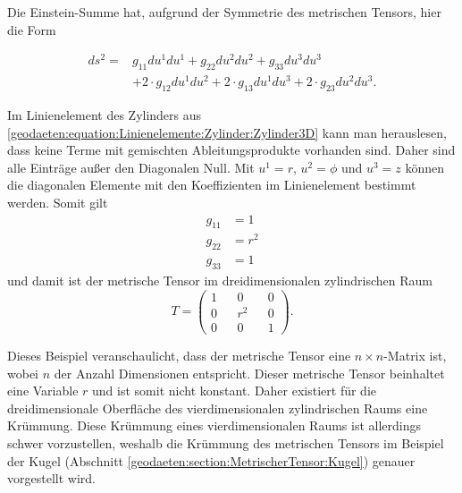 Die Einstein-Summe hat, aufgrund der Symmetrie des metrischen Tensors, hier die Form

\begin{equation}
	\begin{aligned}
	ds^2 = &g_{11}  du^1  du^1 + g_{22}  du^2  du^2 + g_{33}  du^3  du^3 \nonumber \\
	&+ 2 \cdot g_{12}  du^1  du^2 + 2 \cdot g_{13}  du^1  du^3 + 2 \cdot g_{23}  du^2  du^3 .
	\end{aligned} 
	\label{geodaeten:equation:MetrischerTensor:Kartesisch:EinsteinSumme3D}
\end{equation}

Im Linienelement des Zylinders aus \eqref{geodaeten:equation:Linienelemente:Zylinder:Zylinder3D} kann man herauslesen, dass keine Terme mit gemischten Ableitungsprodukte vorhanden sind.
Daher sind alle Einträge außer den Diagonalen Null.
Mit $u^1 = r$, $u^2 = \phi$ und $u^3 = z$  können die diagonalen Elemente mit den Koeffizienten im Linienelement bestimmt werden. 
Somit gilt
\begin{equation}
	\begin{aligned}
		g_{11}  &= 1  \\
		g_{22}  &= r^2 \\
		g_{33}  &= 1  
	\end{aligned}
\end{equation}
und damit ist der metrische Tensor im dreidimensionalen zylindrischen Raum
\begin{equation}
	T = \begin{pmatrix} 1 && 0 && 0 \\ 0 && r^2 && 0 \\ 0 && 0 && 1 \end{pmatrix} .
\end{equation}

Dieses Beispiel veranschaulicht, dass der metrische Tensor eine $n \times n$-Matrix ist, wobei $n$ der Anzahl Dimensionen entspricht.
Dieser metrische Tensor beinhaltet eine Variable $r$ und ist somit nicht konstant. 
Daher existiert für die dreidimensionale Oberfläche des vierdimensionalen zylindrischen Raums eine Krümmung.
Diese Krümmung eines vierdimensionalen Raums ist allerdings schwer vorzustellen, weshalb die Krümmung des metrischen Tensors im Beispiel der Kugel (Abschnitt \ref{geodaeten:section:MetrischerTensor:Kugel}) genauer vorgestellt wird.
